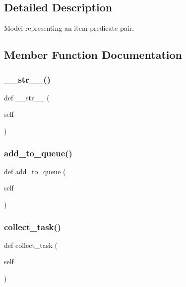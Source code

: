\subsection{Detailed Description}
\begin{DoxyVerb}Model representing an item-predicate pair.
\end{DoxyVerb}
 

\subsection{Member Function Documentation}
\mbox{\label{classdynamicfilterapp_1_1models_1_1_i_p___pair_a23e8041ce1015febe4fdace3225714f9}} 
\subsubsection{\texorpdfstring{\_\_str\_\_()}{\_\_str\_\_()}}
{\footnotesize\ttfamily def \+\_\+\+\_\+str\+\_\+\+\_\+ (\begin{DoxyParamCaption}\item[{}]{self }\end{DoxyParamCaption})}

\mbox{\label{classdynamicfilterapp_1_1models_1_1_i_p___pair_ac83cd255885b9a7b8852cd66fad6da53}} 
\subsubsection{\texorpdfstring{add\_to\_queue()}{add\_to\_queue()}}
{\footnotesize\ttfamily def add\+\_\+to\+\_\+queue (\begin{DoxyParamCaption}\item[{}]{self }\end{DoxyParamCaption})}

\mbox{\label{classdynamicfilterapp_1_1models_1_1_i_p___pair_a7fcdd3e1ce91010e08372a2160f1ce42}} 
\subsubsection{\texorpdfstring{collect\_task()}{collect\_task()}}
{\footnotesize\ttfamily def collect\+\_\+task (\begin{DoxyParamCaption}\item[{}]{self }\end{DoxyParamCaption})}

